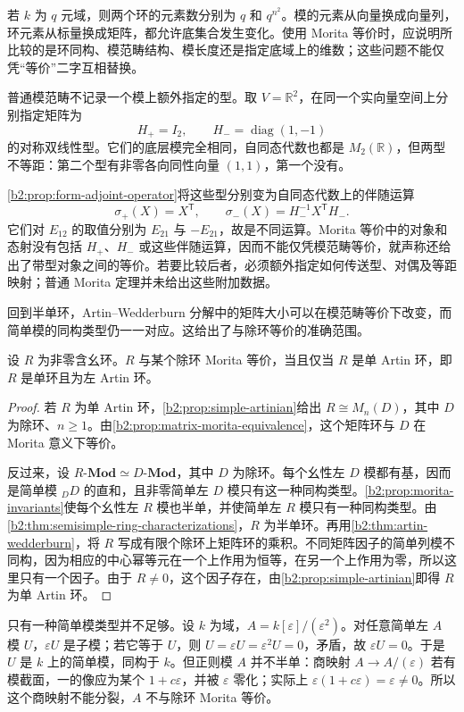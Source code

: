 \ProseParagraphBreak
若 \(k\) 为 \(q\) 元域，则两个环的元素数分别为 \(q\) 和 \(q^{n^2}\)。模的元素从向量换成向量列，环元素从标量换成矩阵，都允许底集合发生变化。使用 Morita 等价时，应说明所比较的是环同构、模范畴结构、模长度还是指定底域上的维数；这些问题不能仅凭“等价”二字互相替换。

\begin{example}\label{b2:exm:morita-forgets-forms}
	普通模范畴不记录一个模上额外指定的型。取 \(V=\mathbb R^2\)，在同一个实向量空间上分别指定矩阵为
	\[
		H_+=I_2,\qquad H_-=\operatorname{diag}(1,-1)
	\]
	的对称双线性型。它们的底层模完全相同，自同态代数也都是 \(M_2(\mathbb R)\)，但两型不等距：第二个型有非零各向同性向量 \((1,1)\)，第一个没有。
\end{example}

\cref{b2:prop:form-adjoint-operator}将这些型分别变为自同态代数上的伴随运算
\[
	\sigma_+(X)=X^{\mathsf T},\qquad \sigma_-(X)=H_-^{-1}X^{\mathsf T}H_-.
\]
它们对 \(E_{12}\) 的取值分别为 \(E_{21}\) 与 \(-E_{21}\)，故是不同运算。Morita 等价中的对象和态射没有包括 \(H_+\)、\(H_-\) 或这些伴随运算，因而不能仅凭模范畴等价，就声称还给出了带型对象之间的等价。若要比较后者，必须额外指定如何传送型、对偶及等距映射；普通 Morita 定理并未给出这些附加数据。

\ProseParagraphBreak
回到半单环，Artin–Wedderburn 分解中的矩阵大小可以在模范畴等价下改变，而简单模的同构类型仍一一对应。这给出了与除环等价的准确范围。

\begin{corollary}\label{b2:cor:morita-division-ring}
	设 \(R\) 为非零含幺环。\(R\) 与某个除环 Morita 等价，当且仅当 \(R\) 是单 Artin 环，即 \(R\) 是单环且为左 Artin 环。
\end{corollary}
\begin{proof}
	若 \(R\) 为单 Artin 环，\cref{b2:prop:simple-artinian}给出 \(R\cong M_n(D)\)，其中 \(D\) 为除环、\(n\ge1\)。由\cref{b2:prop:matrix-morita-equivalence}，这个矩阵环与 \(D\) 在 Morita 意义下等价。

	反过来，设 \(R\text{-}\mathbf{Mod}\simeq D\text{-}\mathbf{Mod}\)，其中 \(D\) 为除环。每个幺性左 \(D\) 模都有基，因而是简单模 \({}_DD\) 的直和，且非零简单左 \(D\) 模只有这一种同构类型。\cref{b2:prop:morita-invariants}使每个幺性左 \(R\) 模也半单，并使简单左 \(R\) 模只有一种同构类型。由\cref{b2:thm:semisimple-ring-characterizations}，\(R\) 为半单环。再用\cref{b2:thm:artin-wedderburn}，将 \(R\) 写成有限个除环上矩阵环的乘积。不同矩阵因子的简单列模不同构，因为相应的中心幂等元在一个上作用为恒等，在另一个上作用为零，所以这里只有一个因子。由于 \(R\ne0\)，这个因子存在，由\cref{b2:prop:simple-artinian}即得 \(R\) 为单 Artin 环。
\end{proof}

只有一种简单模类型并不足够。设 \(k\) 为域，\(A=k[\varepsilon]/(\varepsilon^2)\)。对任意简单左 \(A\) 模 \(U\)，\(\varepsilon U\) 是子模；若它等于 \(U\)，则 \(U=\varepsilon U=\varepsilon^2U=0\)，矛盾，故 \(\varepsilon U=0\)。于是 \(U\) 是 \(k\) 上的简单模，同构于 \(k\)。但正则模 \(A\) 并不半单：商映射 \(A\to A/(\varepsilon)\) 若有模截面，一的像应为某个 \(1+c\varepsilon\)，并被 \(\varepsilon\) 零化；实际上 \(\varepsilon(1+c\varepsilon)=\varepsilon\ne0\)。所以这个商映射不能分裂，\(A\) 不与除环 Morita 等价。
